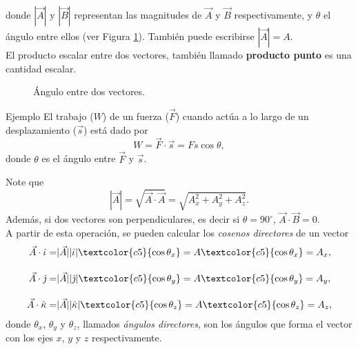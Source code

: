 
donde $|\vec{A}|$ y $|\vec{B}|$ representan las magnitudes de $\vec{A}$ y $\vec{B}$ respectivamente, y $\theta$ el \'angulo entre ellos (ver Figura \ref{fig:apb}). Tambi\'en puede escribirse $|\vec{A}|=A$.\\[.35cm]

El producto escalar entre dos vectores, tambi\'en llamado \textbf{producto punto} es una cantidad escalar. \\[.35cm]
\begin{figure}[h!]
\begin{center}

\end{center}
\caption{\'Angulo entre dos vectores.}
\label{fig:apb}
\end{figure}

\begin{wwteorema}{Ejemplo}
El trabajo ($W$) de un fuerza ($\vec{F}$) cuando act\'ua a lo largo de un desplazamiento ($\vec{s}$) est\'a dado por 
$$W=\vec{F}\cdot \vec{s}=Fs\cos \theta,$$
donde $\theta$ es el \'angulo entre $\vec{F}$ y $\vec{s}$.
\end{wwteorema}

Note que 
$$|\vec{A}|=\sqrt{\vec{A}\cdot\vec{A}}= \sqrt{A_x^{2}+A_y^{2}+A_z^{2}}.$$
Adem\'as, si dos vectores son perpendiculares, es decir si $\theta=90^{\circ}$, $\vec{A}\cdot\vec{B}=0$. \\[.35cm] 
A partir de esta operaci\'on, se pueden calcular los \textit{\textcolor{c5}{cosenos directores}} de un vector
\begin{align*}
\vec{A}\cdot\hat{\iota}=&|\vec{A}||\hat{\iota}|\textcolor{c5}{\cos\theta_{x}}=A\textcolor{c5}{\cos\theta_{x}}=A_{x}, \\[.35cm]
\vec{A}\cdot\hat{\jmath}=&|\vec{A}||\hat{\jmath}|\textcolor{c5}{\cos\theta_{y}}=A\textcolor{c5}{\cos\theta_{y}}=A_{y}, \\[.35cm]
\vec{A}\cdot\hat{\kappa}=&|\vec{A}||\hat{\kappa}|\textcolor{c5}{\cos\theta_{z}}=A\textcolor{c5}{\cos\theta_{z}}=A_{z},
\end{align*}
donde $\theta_{x}$, $\theta_{y}$ y $\theta_{z}$, llamados \textit{\'angulos directores}, son los \'angulos que forma el vector  con los ejes $x$, $y$ y $z$ respectivamente.





